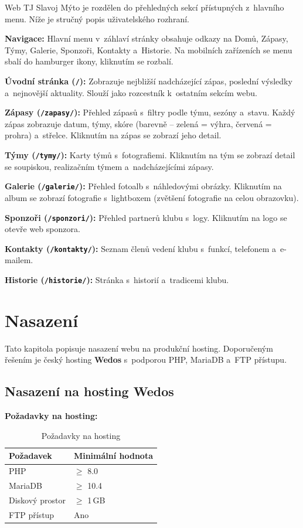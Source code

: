 \documentclass[12pt,a4paper]{article}
\begin{document}
Web TJ Slavoj Mýto je rozdělen do přehledných sekcí přístupných z~hlavního menu. Níže je stručný popis uživatelského rozhraní.

\textbf{Navigace:} Hlavní menu v~záhlaví stránky obsahuje odkazy na Domů, Zápasy, Týmy, Galerie, Sponzoři, Kontakty a~Historie. Na mobilních zařízeních se menu sbalí do hamburger ikony, kliknutím se rozbalí.

\textbf{Úvodní stránka (\texttt{/}):} Zobrazuje nejbližší nadcházející zápas, poslední výsledky a~nejnovější aktuality. Slouží jako rozcestník k~ostatním sekcím webu.

\textbf{Zápasy (\texttt{/zapasy/}):} Přehled zápasů s~filtry podle týmu, sezóny a~stavu. Každý zápas zobrazuje datum, týmy, skóre (barevně -- zelená = výhra, červená = prohra) a~střelce. Kliknutím na zápas se zobrazí jeho detail.

\textbf{Týmy (\texttt{/tymy/}):} Karty týmů s~fotografiemi. Kliknutím na tým se zobrazí detail se soupiskou, realizačním týmem a~nadcházejícími zápasy.

\textbf{Galerie (\texttt{/galerie/}):} Přehled fotoalb s~náhledovými obrázky. Kliknutím na album se zobrazí fotografie s~lightboxem (zvětšení fotografie na celou obrazovku).

\textbf{Sponzoři (\texttt{/sponzori/}):} Přehled partnerů klubu s~logy. Kliknutím na logo se otevře web sponzora.

\textbf{Kontakty (\texttt{/kontakty/}):} Seznam členů vedení klubu s~funkcí, telefonem a~e-mailem.

\textbf{Historie (\texttt{/historie/}):} Stránka s~historií a~tradicemi klubu.

\clearpage
\section{Nasazení}

Tato kapitola popisuje nasazení webu na produkční hosting. Doporučeným řešením je český hosting \textbf{Wedos} s~podporou PHP, MariaDB a~FTP přístupu.

\subsection{Nasazení na hosting Wedos}

\textbf{Požadavky na hosting:}

\begin{table}[H]
\centering
\begin{tabular}{ll}
\toprule
\textbf{Požadavek} & \textbf{Minimální hodnota} \\
\midrule
PHP & $\geq$ 8.0 \\
MariaDB & $\geq$ 10.4 \\
Diskový prostor & $\geq$ 1\,GB \\
FTP přístup & Ano \\
\bottomrule
\end{tabular}
\caption{Požadavky na hosting}
\end{table}
\end{document}
